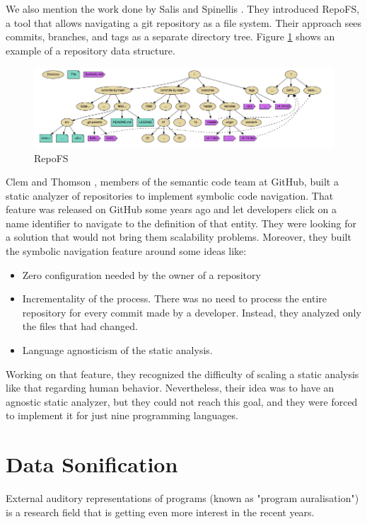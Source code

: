 \bigbreak
We also mention the work done by Salis and Spinellis \cite[]{Salis2019}.
They introduced RepoFS, a tool that allows navigating a git repository as a file system. 
Their approach sees commits, branches, and tags as a separate directory tree. 
Figure \ref{fig:RepoFS} shows an example of a repository data structure. 

\begin{figure}[H]
\centering
  \includegraphics[width=0.9\linewidth]{Salis2019.png} 
  \caption{RepoFS}
  \label{fig:RepoFS}
\end{figure}

\bigbreak
Clem and Thomson \cite[]{Clem2021}, members of the semantic code team at GitHub, built a static analyzer of repositories to implement symbolic code navigation. 
That feature was released on GitHub some years ago and let developers click on a name identifier to navigate to the definition of that entity. 
They were looking for a solution that would not bring them scalability problems. 
Moreover, they built the symbolic navigation feature around some ideas like:
\begin{itemize}
  \item Zero configuration needed by the owner of a repository
  \item Incrementality of the process. There was no need to process the entire repository for every commit made by a developer. Instead, they analyzed only the files that had changed. 
  \item Language agnosticism of the static analysis. 
\end{itemize}

Working on that feature, they recognized the difficulty of scaling a static analysis like that regarding human behavior. 
Nevertheless, their idea was to have an agnostic static analyzer, but they could not reach this goal, and they were forced to implement it for just nine programming languages.  

\section{Data Sonification}

External auditory representations of programs (known as "program auralisation") is a research field that 
is getting even more interest in the recent years.

